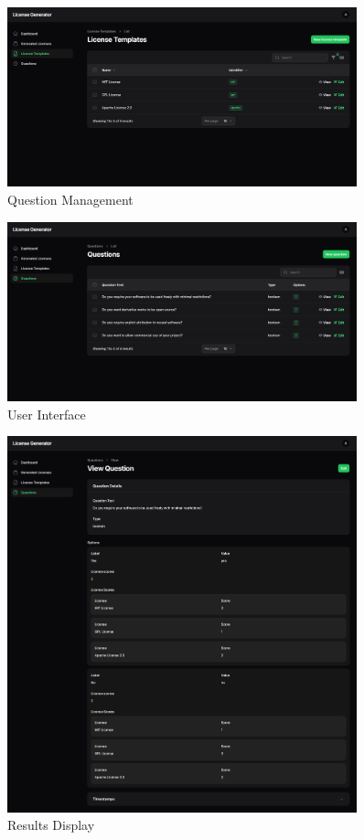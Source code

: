 \documentclass[12pt,a4paper]{report}
\begin{document}
\begin{figure}[H]
    \centering
    \includegraphics[width=0.9\textwidth]{Screenshots/os6.png}
    \caption{Question Management}
\end{figure}

\begin{figure}[H]
    \centering
    \includegraphics[width=0.9\textwidth]{Screenshots/os7.png}
    \caption{User Interface}
\end{figure}

\begin{figure}[H]
    \centering
    \includegraphics[width=0.9\textwidth]{Screenshots/os8.png}
    \caption{Results Display}
\end{figure}
\end{document}
